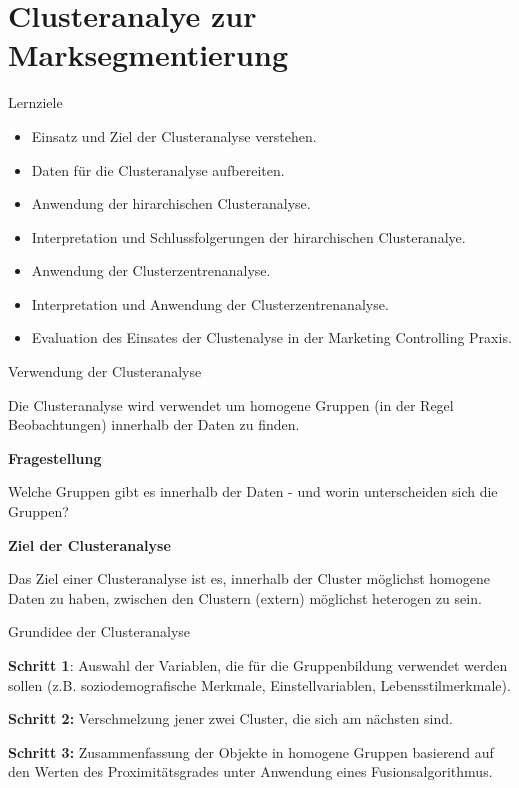 \documentclass[12pt,ngerman,a4paper,ignorenonframetext,]{beamer}
\providecommand{\tightlist}{%
  \setlength{\itemsep}{0pt}\setlength{\parskip}{0pt}}
\begin{document}
\hypertarget{clusteranalye-zur-marksegmentierung}{%
\section{Clusteranalye zur
Marksegmentierung}\label{clusteranalye-zur-marksegmentierung}}

\begin{frame}{Lernziele}
\protect\hypertarget{lernziele-6}{}

\begin{itemize}
\tightlist
\item
  Einsatz und Ziel der Clusteranalyse verstehen.
\item
  Daten für die Clusteranalyse aufbereiten.
\item
  Anwendung der hirarchischen Clusteranalyse.
\item
  Interpretation und Schlussfolgerungen der hirarchischen Clusteranalye.
\item
  Anwendung der Clusterzentrenanalyse.
\item
  Interpretation und Anwendung der Clusterzentrenanalyse.
\item
  Evaluation des Einsates der Clustenalyse in der Marketing Controlling
  Praxis.
\end{itemize}

\end{frame}

\begin{frame}{Verwendung der Clusteranalyse}
\protect\hypertarget{verwendung-der-clusteranalyse}{}

Die Clusteranalyse wird verwendet um homogene Gruppen (in der Regel
Beobachtungen) innerhalb der Daten zu finden.

\textbf{Fragestellung}

Welche Gruppen gibt es innerhalb der Daten - und worin unterscheiden
sich die Gruppen?

\textbf{Ziel der Clusteranalyse}

Das Ziel einer Clusteranalyse ist es, innerhalb der Cluster möglichst
homogene Daten zu haben, zwischen den Clustern (extern) möglichst
heterogen zu sein.

\end{frame}

\begin{frame}{Grundidee der Clusteranalyse}
\protect\hypertarget{grundidee-der-clusteranalyse}{}

\textbf{Schritt 1}: Auswahl der Variablen, die für die Gruppenbildung
verwendet werden sollen \mbox{(z.\thinspace{}B.}\xspace{}
soziodemografische Merkmale, Einstellvariablen, Lebensstilmerkmale).

\textbf{Schritt 2:} Verschmelzung jener zwei Cluster, die sich am
nächsten sind.

\textbf{Schritt 3:} Zusammenfassung der Objekte in homogene Gruppen
basierend auf den Werten des Proximitätsgrades unter Anwendung eines
Fusionsalgorithmus.

\end{frame}
\end{document}
